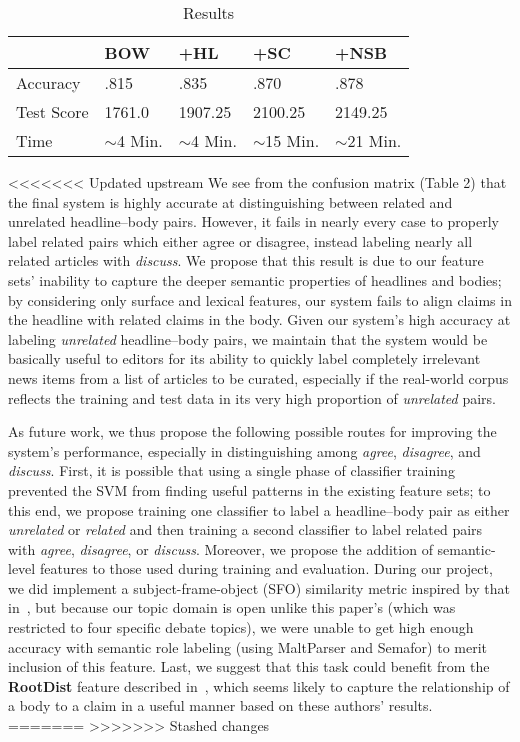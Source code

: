\documentclass[11pt,a4paper]{article}
\begin{document}
\begin{table}
  \centering
  \caption{Results}

    \begin{tabular}{| l | l | l | l | l |}
    
    \hline
     & BOW & +HL & +SC & +NSB\\ \hline
    Accuracy & .815 & .835 & .870 & .878\\ \hline
    Test Score & 1761.0& 1907.25 & 2100.25 & 2149.25\\ \hline
    Time & $\sim$4 Min. &$\sim$4 Min. & $\sim$15 Min. & $\sim$21 Min. \\
    \hline
    \end{tabular}
    
\end{table}

<<<<<<< Updated upstream
We see from the confusion matrix (Table 2) that the final system is highly accurate at distinguishing between related and unrelated headline--body pairs. However, it fails in nearly every case to properly label related pairs which either agree or disagree, instead labeling nearly all related articles with \textit{discuss}. We propose that this result is due to our feature sets' inability to capture the deeper semantic properties of headlines and bodies; by considering only surface and lexical features, our system fails to align claims in the headline with related claims in the body. Given our system's high accuracy at labeling \textit{unrelated }headline--body pairs, we maintain that the system would be basically useful to editors for its ability to quickly label completely irrelevant news items from a list of articles to be curated, especially if the real-world corpus reflects the training and test data in its very high proportion of \textit{unrelated} pairs.

As future work, we thus propose the following possible routes for improving the system's performance, especially in distinguishing among \textit{agree}, \textit{disagree}, and \textit{discuss}. First, it is possible that using a single phase of classifier training prevented the SVM from finding useful patterns in the existing feature sets; to this end, we propose training one classifier to label a headline--body pair as either \textit{unrelated} or \textit{related} and then training a second classifier to label related pairs with \textit{agree}, \textit{disagree}, or \textit{discuss}. Moreover, we propose the addition of semantic-level features to those used during training and evaluation. During our project, we did implement a subject-frame-object (SFO) similarity metric inspired by that in~\cite{Hasan2013}, but because our topic domain is open unlike this paper's (which was restricted to four specific debate topics), we were unable to get high enough accuracy with semantic role labeling (using MaltParser and Semafor) to merit inclusion of this feature. Last, we suggest that this task could benefit from the \textbf{RootDist} feature described in~\cite{ferreira2016emergent}, which seems likely to capture the relationship of a body to a claim in a useful manner based on these authors' results.
=======
>>>>>>> Stashed changes
\end{document}
